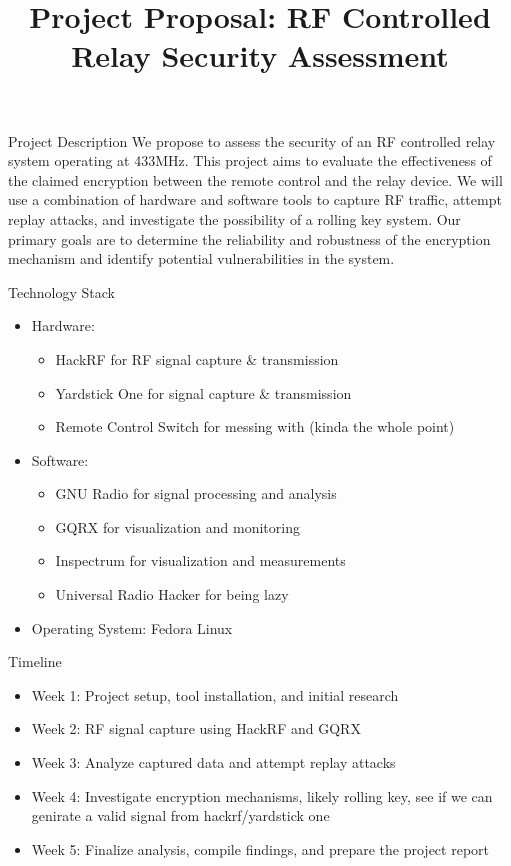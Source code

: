 \documentclass{beamer}
\title{Project Proposal: RF Controlled Relay Security Assessment}
\author{}
\date{}
\begin{document}
\begin{frame}
\titlepage
\end{frame}

\begin{frame}{Project Description}
We propose to assess the security of an RF controlled relay system operating at 433MHz. This project aims to evaluate the effectiveness of the claimed encryption between the remote control and the relay device. We will use a combination of hardware and software tools to capture RF traffic, attempt replay attacks, and investigate the possibility of a rolling key system. Our primary goals are to determine the reliability and robustness of the encryption mechanism and identify potential vulnerabilities in the system.
\end{frame}

\begin{frame}{Technology Stack}
\begin{itemize}
    \item Hardware:
    \begin{itemize}
        \item HackRF for RF signal capture \& transmission
        \item Yardstick One for signal capture \& transmission
        \item Remote Control Switch for messing with (kinda the whole point)
    \end{itemize}
    \item Software:
    \begin{itemize}
        \item GNU Radio for signal processing and analysis
        \item GQRX for visualization and monitoring
        \item Inspectrum for visualization and measurements
        \item Universal Radio Hacker for being lazy 
    \end{itemize}
    \item Operating System: Fedora Linux
\end{itemize}
\end{frame}

\begin{frame}{Timeline}
\begin{itemize}
    \item Week 1: Project setup, tool installation, and initial research
    \item Week 2: RF signal capture using HackRF and GQRX
    \item Week 3: Analyze captured data and attempt replay attacks
    \item Week 4: Investigate encryption mechanisms, likely rolling key, see if we can genirate a valid signal from hackrf/yardstick one
    \item Week 5: Finalize analysis, compile findings, and prepare the project report
\end{itemize}
\end{frame}
\end{document}
